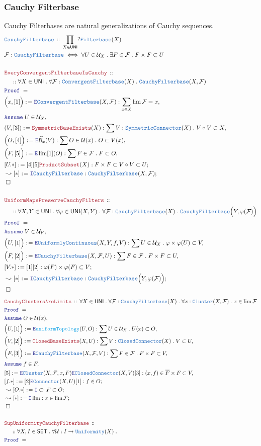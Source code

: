 \documentclass[12pt]{scrartcl}
\newcommand{\TYPE}[1]{\textcolor{NavyBlue}{\mathtt{#1}}}
\newcommand{\FUNC}[1]{\textcolor{Cerulean}{\mathtt{#1}}}
\newcommand{\LOGIC}[1]{\textcolor{Blue}{\mathtt{#1}}}
\newcommand{\THM}[1]{\textcolor{Maroon}{\mathtt{#1}}}
\renewcommand{\.}{\; . \;}
\newcommand{\de}{: \kern 0.1pc =}
\newcommand{\Theorem}[2]{& \THM{#1} \, :: \, #2 \\ & \Proof = \\ }
\newcommand{\DeclareType}[2]{& \TYPE{#1} \, :: \, #2 \\}
\newcommand{\DefineType}[3]{& #1 : \TYPE{#2} \iff #3 \\}
\newcommand{\NewLine}{\\ & \kern 1pc}
\newcommand{\Page}[1]{ \begin{align*} #1 \end{align*}   }
\newcommand{\Say}[3]{& #1 \de #2 : #3, \\}
\newcommand{\Conclude}[3]{& #1 \de #2 : #3; \\}
\newcommand{\DeriveConclude}[3]{& \leadsto #1 \de #2 : #3 ; \\}
\newcommand{\AssumeIn}[2]{& \LOGIC{Assume} \; #1 \in #2, \\}
\newcommand{\Intro}{\LOGIC{I}}
\newcommand{\Elim}{\LOGIC{E}}
\newcommand{\QED}{\; \square}
\newcommand{\EndProof}{& \QED \\}
\newcommand{\Proof}{\LOGIC{Proof} \; }
\newcommand{\B}{\mathcal{B}}
\newcommand{\SET}{\mathsf{SET}}
\newcommand{\Filterbase}{\TYPE{Filterbase}}
\newcommand{\CFilterbase}{\TYPE{ConvergentFilterbase}}
\newcommand{\Cluster}{\TYPE{Cluster}}
\renewcommand{\U}{\mathcal{U}}
\newcommand{\F}{\mathcal{F}}
\newcommand{\UNI}{\mathsf{UNI}}
\newcommand{\Connector}{\TYPE{Connector}}
\newcommand{\CConnector}{\TYPE{ClosedConnector}}
\newcommand{\Unif}{\TYPE{Uniformity}}
\newcommand{\Sym}{\TYPE{SymmetricConnector}}
\newcommand{\UC}{\TYPE{UniformlyContinuous}}
\newcommand{\CF}{\TYPE{CauchyFilterbase}}
\begin{document}
\subsubsection{Cauchy Filterbase}
Cauchy Filterbases are natural generalizations of Cauchy sequences.
\Page{
	\DeclareType{\CF}{\prod_{X \in \UNI} ?\Filterbase(X)}
	\DefineType{\F}{\CF}{\forall U \in \U_X \. \exists F \in \F \. F \times F \subset U }
	\\
	\Theorem{EveryConvergentFilterbaseIsCauchy}
	{
		\NewLine ::		
		\forall X \in \UNI \.
		\forall \F : \CFilterbase(X) \.
		\CF(X,\F)
	}
	\Say{\Big(x,[1] \Big)}{\Elim \CFilterbase(X,\F)}
	{
		\sum_{x \in X} \lim \F = x
	}
	\AssumeIn{U}{\U_X}
	\Say{(V,[3])}{\THM{SymmetricBaseExists}(X)}
	{
		\sum V : \Sym(X) \. V \circ V \subset X
	}
	\Say{\Big(O,[4]\Big)}{\Elim \widetilde{\B}_x(V)}
	{
		\sum O \in \U(x) \.  O \subset V(x)
	}
	\Say{\Big( F ,[5] \Big)}{\Elim \lim [1](O)}
	{
		\sum F \in \F \.  F \subset O
	}
	\Conclude{[U.*]}{[4][5]\THM{ProductSubset}(X)}
	{F \times F \subset V \circ V \subset U}
	\DeriveConclude{[*]}{\Intro \CF}{\CF(X,\F)}
	\EndProof
	\\
	\Theorem{UniformMapsPreserveCauchyFilters}
	{
		\NewLine ::		
		\forall X,Y \in \UNI \.
		\forall \varphi \in \UNI(X,Y) \.
		\forall \F : \CF(X) \.
		\CF\Big(Y,\varphi(\F)\Big)
	}
	\AssumeIn{V}{\U_Y}
	\Say{\Big(U,[1]\Big)}{\Elim \UC(X,Y,f,V)}
	{
		\sum U \in \U_X \. \varphi \times \varphi(U) \subset V
	}
	\Say{\Big(F, [2]\Big)}{\Elim \CF(X,\F,U)}
	{
		\sum F \in \F \. F \times F \subset U
	}
	\Conclude{[V.*]}{[1][2]}{\varphi(F) \times \varphi(F) \subset V}
	\DeriveConclude{[*]}{\Intro \CF}{\CF\Big(Y,\varphi(\F)\Big)}
	\EndProof
}\Page{
	\Theorem{CauchyClustersAreLimits}
	{
		\forall X \in \UNI \.
		\forall	\F : \CF(X) \.
		\forall x : \Cluster(X,\F) \.
		x \in \lim \F
	}
	\AssumeIn{O}{\U(x)}
	\Say{\Big(U,[1]\Big)}{\Elim \FUNC{uniformTopology}(U,O)}
	{
		\sum U \in \U_X \.   U(x) \subset O
	}
	\Say{\Big(V,[2]\Big)}{\THM{ClosedBaseExists}(X,U)}
	{
		\sum V : \CConnector(X) \. V \subset U
	}
	\Say{\Big( F, [3] \Big)}{\Elim \CF(X,\F,V)}
	{
		\sum F \in \F \.  F \times F \subset V
	}
	\AssumeIn{f}{F}
	\Say{[5]}{\Elim \Cluster(X,\F,x,F)\Elim \CConnector(X,V)[3]}
	{
		(x,f) \in \overline{F} \times F \subset V
	}
	\Conclude{[f.*]}{[2]\Elim \Connector(X,U)[1]}{f \in O}
	\DeriveConclude{[O.*]}{\Intro \subset}{F \subset O}
	\DeriveConclude{[*]}{\Intro \lim}{x \in \lim \F}
	\EndProof
	\\
	\Theorem{SupUniformityCauchyFilterbase}
	{
		\NewLine ::		
		\forall X,I \in \SET \.
		\forall \U : I \to \Unif(X) \. 
}}
\end{document}
